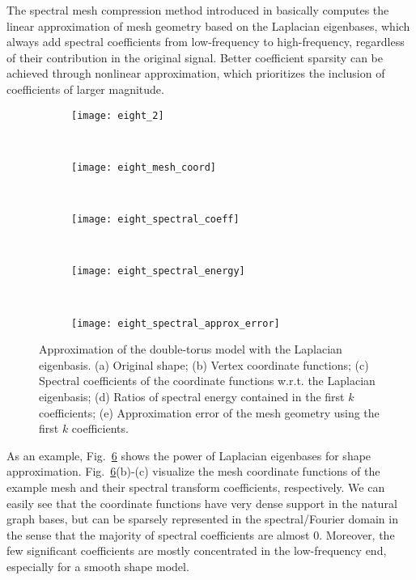 The spectral mesh compression method introduced in \cite{Karni2000} basically computes the
linear approximation of mesh geometry based on the Laplacian eigenbases, which always add spectral coefficients
from low-frequency to high-frequency, regardless of their contribution in the original signal.
Better coefficient sparsity can be achieved through nonlinear approximation,
which prioritizes the inclusion of coefficients of larger magnitude.

\begin{figure}
    \centering
    \begin{subfigure}[b]{0.23\linewidth}
        \texttt{[image: eight\_2]}
        \caption{} \label{fig:eight}
    \end{subfigure}%
    ~
    \begin{subfigure}[b]{0.35\linewidth}
        \texttt{[image: eight\_mesh\_coord]}
        \caption{} \label{fig:eight:coord}
    \end{subfigure}
    ~
    \begin{subfigure}[b]{0.35\linewidth}
        \texttt{[image: eight\_spectral\_coeff]}
        \caption{} \label{fig:eight:spectral:coeff}
    \end{subfigure}%
    \\
    \begin{subfigure}[b]{0.4\linewidth}
        \texttt{[image: eight\_spectral\_energy]}
        \caption{} \label{fig:eight:spectral:energy}
    \end{subfigure}
    ~
    \begin{subfigure}[b]{0.4\linewidth}
        \texttt{[image: eight\_spectral\_approx\_error]}
        \caption{} \label{fig:eight:spectral:approx:error}
    \end{subfigure}
    \caption{Approximation of the double-torus model with the Laplacian
      eigenbasis. (a) Original shape; (b) Vertex coordinate functions;
      (c) Spectral coefficients of the coordinate functions w.r.t. the
      Laplacian eigenbasis; (d) Ratios of spectral energy contained in
      the first $k$ coefficients; (e) Approximation error of the mesh
      geometry using the first $k$ coefficients.}
\label{fig:spectral}
\end{figure}

As an example, Fig.~\ref{fig:spectral} shows the power of Laplacian
eigenbases for shape approximation. Fig.~\ref{fig:spectral}(b)-(c)
visualize the mesh coordinate functions of the example mesh and their
spectral transform coefficients, respectively. We can easily see that
the coordinate functions have very dense support in the natural graph
bases, but can be sparsely represented in the spectral/Fourier domain
in the sense that the majority of spectral coefficients are almost 0.
Moreover, the few significant coefficients are mostly concentrated in
the low-frequency end, especially for a smooth shape model.

